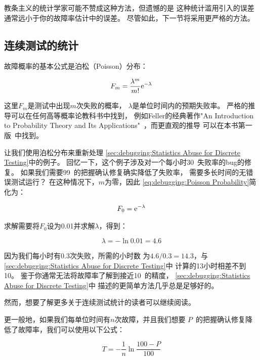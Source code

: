 教条主义的统计学家可能不赞成这种方法，但遗憾的是
这种统计滥用引入的误差通常远小于你的故障率估计中的误差。
尽管如此，下一节将采用更严格的方法。

\subsection{连续测试的统计}
\label{sec:debuggingStatistics for Continuous Testing}

故障概率的基本公式是泊松（Poisson）分布：

\begin{equation}
	F_m = \frac{\lambda^m}{m!} \mathrm{e}^{-\lambda}
\label{eq:debugging:Poisson Probability}
\end{equation}

这里$F_m$是测试中出现$m$次失败的概率，
$\lambda$是单位时间内的预期失败率。
严格的推导可以在任何高等概率论教科书中找到，
例如Feller的经典著作"An Introduction to Probability
Theory and Its Applications"~\cite{Feller58}，而更直观的推导
可以在本书第一版~\cite[Equations 11.8--11.26]{McKenney2014ParallelProgramming-e1}中找到。

让我们使用泊松分布来重新处理
\cref{sec:debugging:Statistics Abuse for Discrete Testing}中的例子。
回忆一下，这个例子涉及对一个每小时30\pct\ 失败率的bug的修复。
如果我们需要99\pct\ 的把握确认修复确实降低了失败率，
需要多长时间的无错误测试运行？
在这种情况下，$m$为零，因此
\cref{eq:debugging:Poisson Probability}简化为：

\begin{equation}
	F_0 =  \mathrm{e}^{-\lambda}
\end{equation}

求解需要将$F_0$设为0.01并求解$\lambda$，得到：

\begin{equation}
	\lambda = - \ln 0.01 = 4.6
\end{equation}

因为我们每小时有$0.3$次失败，所需的小时数
为$4.6/0.3 = 14.3$，与
\cref{sec:debugging:Statistics Abuse for Discrete Testing}中
计算的13小时相差不到10\pct。
鉴于你通常无法将故障率了解到接近10\pct\ 的精度，
\cref{sec:debugging:Statistics Abuse for Discrete Testing}中
描述的更简单方法几乎总是足够好的。

然而，想要了解更多关于连续测试统计的读者可以继续阅读。

更一般地，如果我们每单位时间有$n$次故障，并且我们想要
$P$\pct\ 的把握确认修复降低了故障率，我们可以使用以下公式：

\begin{equation}
	T = - \frac{1}{n} \ln \frac{100 - P}{100}
\label{eq:debugging:Error-Free Test Duration}
\end{equation}

